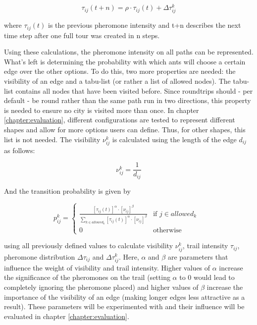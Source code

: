 \begin{equation}\label{eq:trailIntensity}
	\tau_{ij}(t+n) = \rho \cdot \tau_{ij}(t)+\Delta\tau_{ij}^k 
\end{equation}

where $\tau_{ij}(t)$ is the previous pheromone intensity and t+n describes the next time step after one full tour was created in n steps\cite{dorigo_ant_1996}.

Using these calculations, the pheromone intensity on all paths can be represented. 
What's left is determining the probability with which ants will choose a certain edge over the other options.
To do this, two more properties are needed: the visibility of an edge and a tabu-list (or rather a list of allowed nodes).
The tabu-list contains all nodes that have been visited before.
Since roundtrips should - per default - be round rather than the same path run in two directions, this property is needed to ensure no city is visited more than once.
In chapter \ref{chapter:evaluation}, different configurations are tested to represent different shapes and allow for more options users can define. 
Thus, for other shapes, this list is not needed.
The visibility $\nu_{ij}^k$ is calculated using the length of the edge $d_{ij}$ as follows:

\begin{equation}\label{eq:visibility}
	\nu_{ij}^k = \frac{1}{d_{ij}}
\end{equation}

And the transition probability is given by

\begin{equation}\label{eq:transitionProbability}
	p_{ij}^k = \begin{cases}
		\frac{[\tau_{ij}(t)]^{\alpha} \cdot [\nu_{ij}]^{\beta}}{\sum_{k \in allowed_k} [\tau_{ij}(t)]^{\alpha} \cdot [\nu_{ij}]^{\beta}} &\text{if $j \in allowed_k$ }\\
		0 &\text{otherwise}
	\end{cases}
\end{equation}

using all previously defined values to calculate visibility $\nu_{ij}^k$, trail intensity $\tau_{ij}$, pheromone distribution $\Delta\tau_{ij}$ and $\Delta\tau_{ij}^k$.
Here, $\alpha$ and $\beta$ are parameters that influence the weight of visibility and trail intensity.
Higher values of $\alpha$ increase the significance of the pheromones on the trail (setting $\alpha$ to 0 would lead to completely ignoring the pheromone placed) and higher values of $\beta$ increase the importance of the visibility of an edge (making longer edges less attractive as a result)\cite{dorigo_ant_1996}.
These parameters will be experimented with and their influence will be evaluated in chapter \ref{chapter:evaluation}.

